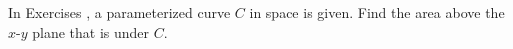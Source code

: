 {\noindent In Exercises}
{, a parameterized curve $C$ in space is given. Find the area above the $x$-$y$ plane that is under $C$.}
